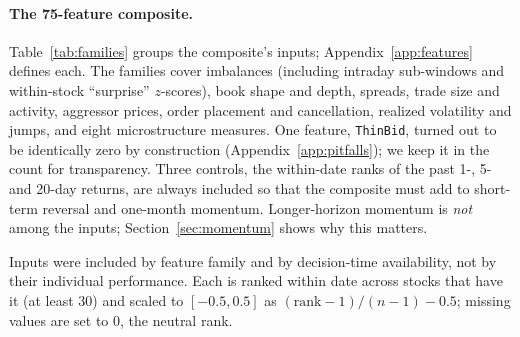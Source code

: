 \paragraph{The 75-feature composite.} Table~\ref{tab:families} groups the composite's inputs; Appendix~\ref{app:features} defines each. The families cover imbalances (including intraday sub-windows and within-stock ``surprise'' $z$-scores), book shape and depth, spreads, trade size and activity, aggressor prices, order placement and cancellation, realized volatility and jumps, and eight microstructure measures. One feature, \texttt{ThinBid}, turned out to be identically zero by construction (Appendix~\ref{app:pitfalls}); we keep it in the count for transparency. Three controls, the within-date ranks of the past 1-, 5- and 20-day returns, are always included so that the composite must add to short-term reversal and one-month momentum. Longer-horizon momentum is \emph{not} among the inputs; Section~\ref{sec:momentum} shows why this matters.

Inputs were included by feature family and by decision-time availability, not by their individual performance. Each is ranked within date across stocks that have it (at least 30) and scaled to $[-0.5,0.5]$ as $(\mathrm{rank}-1)/(n-1)-0.5$; missing values are set to 0, the neutral rank.

